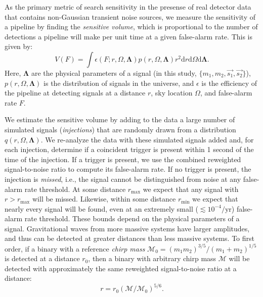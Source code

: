 As the primary metric of search sensitivity in the presense of real detector
data that contains non-Gaussian transient noise sources, we measure the sensitivity of a 
pipeline by finding the \emph{sensitive
volume}, which is proportional to the number of detections a pipeline will
make per unit time at a given false-alarm rate. This is given by:
\begin{equation}
V(F) = \int \epsilon(F; r, \Omega, \mathbf{\Lambda}) p(r, \Omega, \mathbf{\Lambda}) r^2 \mathrm{d}r \mathrm{d}\Omega \mathrm{d}\mathbf{\Lambda}.
\end{equation}
Here, $\mathbf{\Lambda}$ are the physical parameters of a signal (in this
study, $\{m_1, m_2, \vec{s_1}, \vec{s_2}\}$), $p(r, \Omega, \mathbf{\Lambda})$ is the distribution of
signals in the universe, and $\epsilon$ is the efficiency of the pipeline at
detecting signals at a distance $r$, sky location $\Omega$, and false-alarm
rate $F$.

We estimate the sensitive volume by adding to the data a large number of
simulated signals (\emph{injections}) that are randomly drawn from a
distribution $q(r, \Omega, \mathbf{\Lambda})$. We re-analyze the data with 
these simulated signals added and,
for each injection, determine if a coincident trigger is present within 1
second of the time of the injection. If a trigger is present, we use the
combined reweighted signal-to-noise ratio to compute its false-alarm rate. 
If no trigger is present, the injection is
\emph{missed}, i.e., the signal cannot be distinguished from noise at any
false-alarm rate
threshold. At some distance $r_{\max}$ we expect that any signal with $r >
r_{\max}$ will be missed.  Likewise, within some distance $r_{\min}$ we expect
that nearly every signal will be
found, even at an extremely small ($\lesssim 10^{-4} / \mathrm{yr}$)
false-alarm rate
threshold. These bounds depend on the physical parameters of a signal.
Gravitational waves from more massive systems have larger amplitudes, and thus
can be detected at greater distances than less massive systems. To first order,
if a binary with a reference \emph{chirp mass} $\mathcal{M}_0 = (m_1
m_2)^{3/5}/(m_1 + m_2)^{1/5}$ is detected at a distance $r_0$, then a binary
with arbitrary chirp mass $\mathcal{M}$ will be detected with approximately the
same reweighted signal-to-noise ratio at a distance:
\begin{equation}
r = r_{0}(\mathcal{M}/\mathcal{M}_{0})^{5/6}.
\label{eqn:chirp_distance}
\end{equation}


